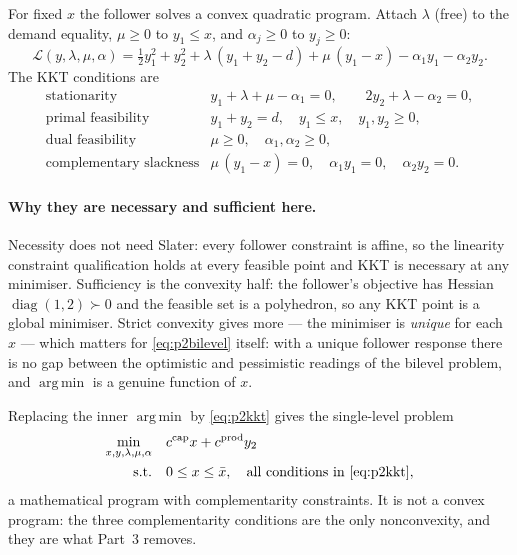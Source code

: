\documentclass[11pt]{article}
\DeclareMathOperator*{\minimize}{min}
\DeclareMathOperator*{\argmin}{arg\,min}
\theoremstyle{definition}
\begin{document}
For fixed $x$ the follower solves a convex quadratic program. Attach
$\lambda$ (free) to the demand equality, $\mu \ge 0$ to $y_1 \le x$,
and $\alpha_j \ge 0$ to $y_j \ge 0$:
\[
  \mathcal{L}(y,\lambda,\mu,\alpha)
  = \tfrac12 y_1^2 + y_2^2 + \lambda\,(y_1 + y_2 - d)
    + \mu\,(y_1 - x) - \alpha_1 y_1 - \alpha_2 y_2 .
\]
The KKT conditions are
\begin{equation}\label{eq:p2kkt}
\begin{array}{ll}
  \text{stationarity} & y_1 + \lambda + \mu - \alpha_1 = 0, \qquad
                        2y_2 + \lambda - \alpha_2 = 0,\\[2pt]
  \text{primal feasibility} & y_1 + y_2 = d, \quad y_1 \le x, \quad
                              y_1, y_2 \ge 0,\\[2pt]
  \text{dual feasibility} & \mu \ge 0, \quad \alpha_1, \alpha_2 \ge 0,\\[2pt]
  \text{complementary slackness} & \mu\,(y_1 - x) = 0, \quad
      \alpha_1 y_1 = 0, \quad \alpha_2 y_2 = 0 .
\end{array}
\end{equation}

\paragraph{Why they are necessary and sufficient here.} Necessity does
not need Slater: every follower constraint is affine, so the linearity
constraint qualification holds at every feasible point and KKT is
necessary at any minimiser. Sufficiency is the convexity half: the
follower's objective has Hessian $\operatorname{diag}(1,2) \succ 0$ and
the feasible set is a polyhedron, so any KKT point is a global
minimiser. Strict convexity gives more --- the minimiser is
\emph{unique} for each $x$ --- which matters for
\eqref{eq:p2bilevel} itself: with a unique follower response there is
no gap between the optimistic and pessimistic readings of the bilevel
problem, and $\argmin$ is a genuine function of $x$.

Replacing the inner $\argmin$ by \eqref{eq:p2kkt} gives the
single-level problem
\begin{equation}\label{eq:p2mpcc}
\begin{aligned}
  \minimize_{x,y,\lambda,\mu,\alpha}\quad
    & c^{\mathrm{cap}} x + c^{\mathrm{prod}} y_2\\
  \text{s.t.}\quad & 0 \le x \le \bar{x}, \quad
    \text{all conditions in \eqref{eq:p2kkt}} ,
\end{aligned}
\end{equation}
a mathematical program with complementarity constraints. It is not a
convex program: the three complementarity conditions are the only
nonconvexity, and they are what Part~3 removes.
\end{document}
